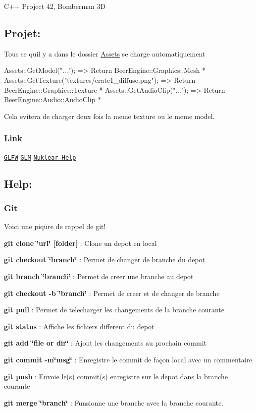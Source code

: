 C++ Project 42, Bomberman 3D \subsection*{Projet\+:}

Tous se qu\textquotesingle{}il y a dans le dossier \mbox{\hyperlink{class_assets}{Assets}} se charge automatiquement 
\begin{DoxyCode}
Assets::GetModel("..."); => Return BeerEngine::Graphics::Mesh *
Assets::GetTexture("textures/crate1\_diffuse.png"); => Return BeerEngine::Graphics::Texture *
Assets::GetAudioClip("..."); => Return BeerEngine::Audio::AudioClip *
\end{DoxyCode}
 Cela evitera de charger deux fois la meme texture ou le meme model. \subsubsection*{Link}

\href{http://www.glfw.org/docs/latest/index.html}{\tt G\+L\+FW} \href{https://glm.g-truc.net/0.9.4/api/a00131.html}{\tt G\+LM} \href{https://github.com/vurtun/nuklear/wiki/Window}{\tt Nuklear Help} \subsection*{Help\+:}

\subsubsection*{Git}

Voici une piqure de rappel de git!
\begin{DoxyItemize}
\item {\bfseries git clone \char`\"{}url\char`\"{} \mbox{[}folder\mbox{]}} \+: Clone un depot en local
\item {\bfseries git checkout \char`\"{}branch\char`\"{}} \+: Permet de changer de branche du depot
\item {\bfseries git branch \char`\"{}branch\char`\"{}} \+: Permet de creer une branche au depot
\item {\bfseries git checkout -\/b \char`\"{}branch\char`\"{}} \+: Permet de creer et de changer de branche
\item {\bfseries git pull} \+: Permet de telecharger les changements de la branche courante
\item {\bfseries git status} \+: Affiche les fichiers different du depot
\item {\bfseries git add \char`\"{}file or dir\char`\"{}} \+: Ajout les changements au prochain commit
\item {\bfseries git commit -\/m\char`\"{}msg\char`\"{}} \+: Enregistre le commit de façon local avec un commentaire
\item {\bfseries git push} \+: Envoie le(s) commit(s) enregistre sur le depot dans la branche courante
\item {\bfseries git merge \char`\"{}branch\char`\"{}} \+: Funsionne une branche avec la branche courante. 
\end{DoxyItemize}